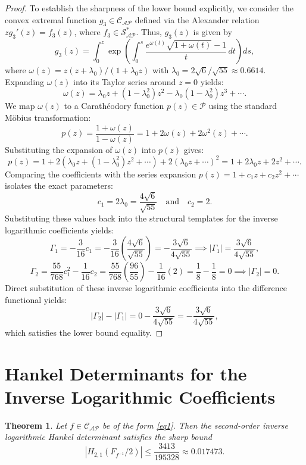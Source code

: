 \documentclass[11pt]{article}
\newtheorem{theo}{Theorem}[section]
\numberwithin{equation}{section}
\begin{document}
\begin{proof}
To establish the sharpness of the lower bound explicitly, we consider the convex extremal function $g_3 \in \mathcal{C}_{\mathcal{AP}}$ defined via the Alexander relation $z g_3'(z) = f_3(z)$, where $f_3 \in \mathcal{S}_{\mathcal{AP}}^{*}$. Thus, $g_3(z)$ is given by
\begin{equation}\label{ext3}
g_3(z) = \int_0^z \exp \left( \int_0^s \frac{e^{\omega(t)}\sqrt{1+\omega(t)}-1}{t}\,dt \right) ds,
\end{equation}
where $\omega(z) = z (z + \lambda_0)/(1 + \lambda_0 z)$ with $\lambda_0 = 2\sqrt{6}/\sqrt{55} \approx 0.6614$.
Expanding $\omega(z)$ into its Taylor series around $z=0$ yields:
\[
\omega(z) = \lambda_0 z + (1 - \lambda_0^2)z^2 - \lambda_0(1 - \lambda_0^2)z^3 + \cdots.
\]
We map $\omega(z)$ to a Carath\'{e}odory function $p(z) \in \mathcal{P}$ using the standard M\"{o}bius transformation:
\[
p(z) = \frac{1 + \omega(z)}{1 - \omega(z)} = 1 + 2\omega(z) + 2\omega^2(z) + \cdots.
\]
Substituting the expansion of $\omega(z)$ into $p(z)$ gives:
\[
p(z) = 1 + 2\left( \lambda_0 z + (1 - \lambda_0^2)z^2 + \cdots \right) + 2\left( \lambda_0 z + \cdots \right)^2 = 1 + 2\lambda_0 z + 2z^2 + \cdots.
\]
Comparing the coefficients with the series expansion $p(z) = 1 + c_1 z + c_2 z^2 + \cdots$ isolates the exact parameters:
\[
c_1 = 2\lambda_0 = \frac{4\sqrt{6}}{\sqrt{55}} \quad \text{and} \quad c_2 = 2.
\]
Substituting these values back into the structural templates for the inverse logarithmic coefficients yields:
\[
\Gamma_1 = -\frac{3}{16}c_1 = -\frac{3}{16}\left( \frac{4\sqrt{6}}{\sqrt{55}} \right) = -\frac{3\sqrt{6}}{4\sqrt{55}} \implies |\Gamma_1| = \frac{3\sqrt{6}}{4\sqrt{55}},
\]
\[
\Gamma_2 = \frac{55}{768}c_1^2 - \frac{1}{16}c_2 = \frac{55}{768}\left(\frac{96}{55}\right) - \frac{1}{16}(2) = \frac{1}{8} - \frac{1}{8} = 0 \implies |\Gamma_2| = 0.
\]
Direct substitution of these inverse logarithmic coefficients into the difference functional yields:
\[
|\Gamma_2| - |\Gamma_1| = 0 - \frac{3\sqrt{6}}{4\sqrt{55}} = -\frac{3\sqrt{6}}{4\sqrt{55}},
\]
which satisfies the lower bound equality.
\end{proof}

\section{Hankel Determinants for the Inverse Logarithmic Coefficients}
\begin{theo}\label{T3}
Let $f \in \mathcal{C}_{\mathcal{AP}}$ be of the form \eqref{eq1}. Then the second-order inverse logarithmic Hankel determinant satisfies the sharp bound
\begin{equation}\label{po11}
\left| H_{2,1}\left(F_{f^{-1}}/2\right) \right| \leq \frac{3413}{195328} \approx 0.017473.
\end{equation}
\end{theo}
\end{document}
